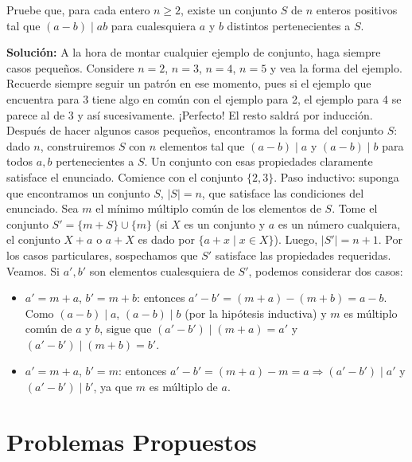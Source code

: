 \documentclass[11pt]{scrartcl}
\begin{document}
\begin{example}[EEUU 1998]
Pruebe que, para cada entero $n \geq 2$, existe un conjunto $S$ de $n$ enteros positivos tal que $(a - b) \mid ab$ para cualesquiera $a$ y $b$ distintos pertenecientes a $S$.
\end{example}
\textbf{Solución:} A la hora de montar cualquier ejemplo de conjunto, haga siempre casos pequeños. Considere $n = 2$, $n = 3$, $n = 4$, $n = 5$ y vea la forma del ejemplo. Recuerde siempre seguir un patrón en ese momento, pues si el ejemplo que encuentra para 3 tiene algo en común con el ejemplo para 2, el ejemplo para 4 se parece al de 3 y así sucesivamente. ¡Perfecto! El resto saldrá por inducción. Después de hacer algunos casos pequeños, encontramos la forma del conjunto $S$: dado $n$, construiremos $S$ con $n$ elementos tal que $(a - b) \mid a$ y $(a - b) \mid b$ para todos $a, b$ pertenecientes a $S$. Un conjunto con esas propiedades claramente satisface el enunciado. Comience con el conjunto $\{2, 3\}$. Paso inductivo: suponga que encontramos un conjunto $S$, $|S| = n$, que satisface las condiciones del enunciado. Sea $m$ el mínimo múltiplo común de los elementos de $S$. Tome el conjunto $S' = \{m + S\} \cup \{m\}$ (si $X$ es un conjunto y $a$ es un número cualquiera, el conjunto $X + a$ o $a + X$ es dado por $\{a + x \mid x \in X\}$). Luego, $|S'| = n + 1$. Por los casos particulares, sospechamos que $S'$ satisface las propiedades requeridas. Veamos. Si $a', b'$ son elementos cualesquiera de $S'$, podemos considerar dos casos:
\begin{itemize}
    \item $a' = m + a$, $b' = m + b$: entonces $a' - b' = (m + a) - (m + b) = a - b$. Como $(a - b) \mid a$, $(a - b) \mid b$ (por la hipótesis inductiva) y $m$ es múltiplo común de $a$ y $b$, sigue que $(a' - b') \mid (m + a) = a'$ y $(a' - b') \mid (m + b) = b'$.
    \item $a' = m + a$, $b' = m$: entonces $a' - b' = (m + a) - m = a \Rightarrow (a' - b') \mid a'$ y $(a' - b') \mid b'$, ya que $m$ es múltiplo de $a$.
\end{itemize}

\section{Problemas Propuestos}
\end{document}
